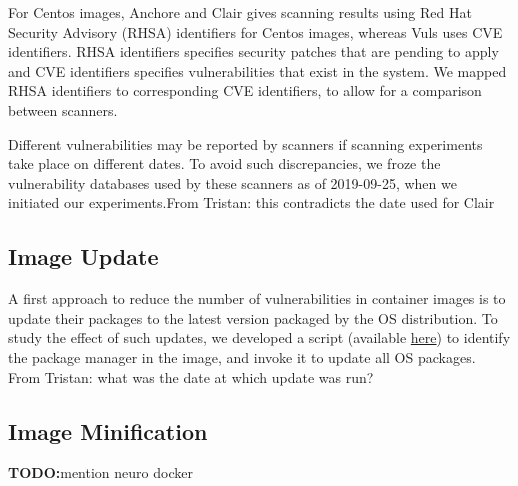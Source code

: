 \documentclass[a4paper,num-refs]{oup-contemporary}
\newcommand{\todo}[1]{\color{red}\textbf{TODO:}#1\color{black}}
\newcommand{\tristan}[1]{\color{blue}From Tristan: #1\color{black}}
\begin{document}
For Centos images, Anchore and Clair gives scanning results using Red Hat
Security Advisory (RHSA) identifiers for Centos images, whereas Vuls uses
CVE identifiers. RHSA identifiers specifies security patches that are
pending to apply and CVE identifiers specifies vulnerabilities that exist
in the system. We mapped RHSA identifiers to corresponding CVE identifiers,
to allow for a comparison between scanners.

Different vulnerabilities may be
reported by scanners if scanning experiments take place on different dates.
To avoid such discrepancies, we froze the vulnerability
databases used by these scanners as of 2019-09-25, when we initiated our
experiments.\tristan{this contradicts the date used for Clair}

\subsection{Image Update}

A first approach to reduce the number of vulnerabilities in container
images is to update their packages to the latest version packaged by the OS
distribution. To study the effect of such updates, we developed a script
(available
\href{https://github.com/big-data-lab-team/container-vulnerabilities-paper/blob/master/Scripts/update}{here})
to identify the package manager in the image, and invoke it to update all
OS packages. \tristan{what was the date at which update was run?}

\subsection{Image Minification}


\todo{mention neuro docker}
\end{document}
